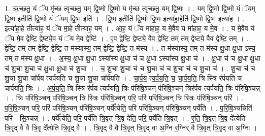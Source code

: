 \documentclass[17pt]{extarticle}
\begin{document}
1. ऋ॒च्छ॒तु॒ यं ॅय मृ॑च्छ त्वृच्छतु॒ यम् द्वि॒ष्मो द्वि॒ष्मो य मृ॑च्छ त्वृच्छतु॒ यम् द्वि॒ष्मः । . यम् द्वि॒ष्मो द्वि॒ष्मो यं ॅयम् द्वि॒ष्म इतीति॑ द्वि॒ष्मो यं ॅयम् द्वि॒ष्म इति॑ । . द्वि॒ष्म इतीति॑ द्वि॒ष्मो द्वि॒ष्म इत्या॑हा॒हेति॑ द्वि॒ष्मो द्वि॒ष्म इत्या॑ह । . इत्या॑हा॒हे तीत्या॑ह॒ यं ॅय मा॒हे तीत्या॑ह॒ यम् । . आ॒ह॒ यं ॅय मा॑हाह॒ य मे॒वैव य मा॑हाह॒ य मे॒व । . य मे॒वैव यं ॅय मे॒व द्वेष्टि॒ द्वेष्ट्ये॒व यं ॅय मे॒व द्वेष्टि॑ । . ए॒व द्वेष्टि॒ द्वेष्ट्ये॒ वैव द्वेष्टि॒ तम् तम् द्वेष्ट्ये॒ वैव द्वेष्टि॒ तम् । . द्वेष्टि॒ तम् तम् द्वेष्टि॒ द्वेष्टि॒ त म॑स्यास्य॒ तम् द्वेष्टि॒ द्वेष्टि॒ त म॑स्य । . त म॑स्यास्य॒ तम् त म॑स्य क्षु॒धा क्षु॒धा ऽस्य॒ तम् त म॑स्य क्षु॒धा । . अ॒स्य॒ क्षु॒धा क्षु॒धा ऽस्या᳚स्य क्षु॒धा च॑ च क्षु॒धा ऽस्या᳚स्य क्षु॒धा च॑ । . क्षु॒धा च॑ च क्षु॒धा क्षु॒धा च॑ शु॒चा शु॒चा च॑ क्षु॒धा क्षु॒धा च॑ शु॒चा । . च॒ शु॒चा शु॒चा च॑ च शु॒चा च॑ च शु॒चा च॑ च शु॒चा च॑ । . शु॒चा च॑ च शु॒चा शु॒चा चा᳚र्पय त्यर्पयति च शु॒चा शु॒चा चा᳚र्पयति । . चा॒र्प॒य॒ त्य॒र्प॒य॒ति॒ च॒ चा॒र्प॒य॒ति॒ त्रि स्त्रि र॑र्पयति च चार्पयति॒ त्रिः । . अ॒र्प॒य॒ति॒ त्रि स्त्रि र॑र्पय त्यर्पयति॒ त्रिः प॑रिषि॒ञ्चन् प॑रिषि॒ञ्चन् त्रिर॑र्पय त्यर्पयति॒ त्रिः प॑रिषि॒ञ्चन्न् । . त्रिः प॑रिषि॒ञ्चन् प॑रिषि॒ञ्चन् त्रि स्त्रिः प॑रिषि॒ञ्चन् परि॒ परि॑ परिषि॒ञ्चन् त्रि स्त्रिः प॑रिषि॒ञ्चन् परि॑ । . प॒रि॒षि॒ञ्चन् परि॒ परि॑ परिषि॒ञ्चन् प॑रिषि॒ञ्चन् पर्ये᳚त्येति॒ परि॑ परिषि॒ञ्चन् प॑रिषि॒ञ्चन् पर्ये॑ति । . प॒रि॒षि॒ञ्चन्निति॑ परि - सि॒ञ्चन्न् । . पर्ये᳚त्येति॒ परि॒ पर्ये॑ति त्रि॒वृत् त्रि॒वृ दे॑ति॒ परि॒ पर्ये॑ति त्रि॒वृत् । . ए॒ति॒ त्रि॒वृत् त्रि॒वृ दे᳚त्येति त्रि॒वृद् वै वै त्रि॒वृ दे᳚त्येति त्रि॒वृद् वै । . त्रि॒वृद् वै वै त्रि॒वृत् त्रि॒वृद् वा अ॒ग्नि र॒ग्निर् वै त्रि॒वृत् त्रि॒वृद् वा अ॒ग्निः । \newline
\end{document}
